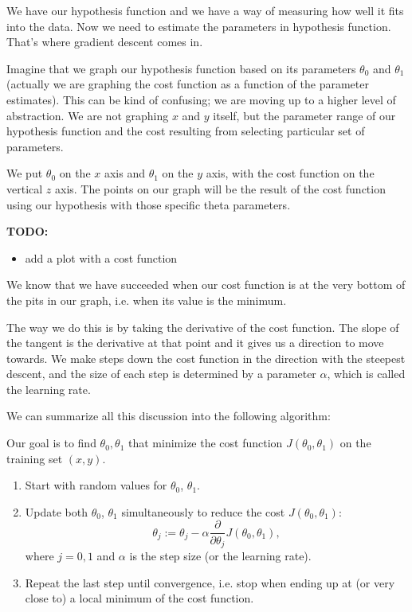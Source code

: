 \documentclass[a4paper,11pt]{report}
\begin{document}
We have our hypothesis function and we have a way of measuring how well it fits into the data. Now we need to estimate the parameters in hypothesis function. That's where gradient descent comes in.

Imagine that we graph our hypothesis function based on its parameters $\theta_0$ and $\theta_1$ (actually we are graphing the cost function as a function of the parameter estimates). This can be kind of confusing; we are moving up to a higher level of abstraction. We are not graphing $x$ and $y$ itself, but the parameter range of our hypothesis function and the cost resulting from selecting particular set of parameters.

We put $\theta_0$ on the $x$ axis and $\theta_1$ on the $y$ axis, with the cost function on the vertical $z$ axis. The points on our graph will be the result of the cost function using our hypothesis with those specific theta parameters.

\textbf{TODO:}
\begin{itemize}
  \item add a plot with a cost function
\end{itemize}

We know that we have succeeded when our cost function is at the very bottom of the pits in our graph, i.e. when its value is the minimum.

The way we do this is by taking the derivative of the cost function. The slope of the tangent is the derivative at that point and it gives us a direction to move towards. We make steps down the cost function in the direction with the steepest descent, and the size of each step is determined by a parameter $\alpha$, which is called the learning rate.

We can summarize all this discussion into the following algorithm:

Our goal is to find $\theta_0, \theta_1$ that minimize the cost function $J(\theta_0, \theta_1)$ on the training set $(x, y)$.

\begin{enumerate}
  \item Start with random values for $\theta_0$, $\theta_1$.
  \item Update both $\theta_0$, $\theta_1$ simultaneously to reduce the cost $J(\theta_0, \theta_1)$:
        \begin{equation}\label{eq:lin-reg-gd}
        \theta_j := \theta_j - \alpha \frac{\partial}{\partial \theta_j} J(\theta_0, \theta_1),
        \end{equation}
        where $j=0,1$ and $\alpha$ is the step size (or the learning rate).
  \item Repeat the last step until convergence, i.e. stop when ending up at (or very close to) a local minimum of the cost function.
\end{enumerate}
\end{document}
